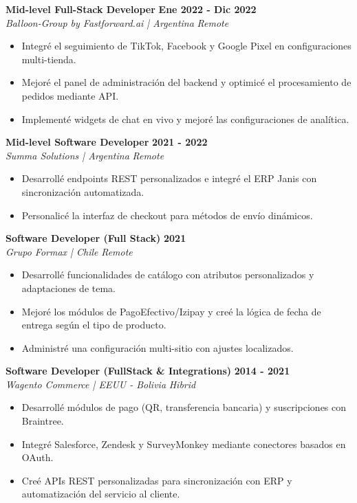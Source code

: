 \documentclass[11pt, a4paper]{article}
\newcommand{\jobtitle}[2]{\textbf{#1} \hfill \textbf{\small #2}} %
\newcommand{\company}[1]{\textit{#1}} %
\begin{document}
\jobtitle{Mid-level Full-Stack Developer}{Ene 2022 - Dic 2022} \\
\company{Balloon-Group by Fastforward.ai | Argentina} \hfill \textit{Remote}
\begin{itemize}[noitemsep, topsep=3pt]
	\item Integré el seguimiento de TikTok, Facebook y Google Pixel en configuraciones multi-tienda.
	\item Mejoré el panel de administración del backend y optimicé el procesamiento de pedidos mediante API.
	\item Implementé widgets de chat en vivo y mejoré las configuraciones de analítica.
\end{itemize}


\jobtitle{Mid-level Software Developer}{2021 - 2022} \\
\company{Summa Solutions | Argentina} \hfill \textit{Remote}
\begin{itemize}[noitemsep, topsep=3pt]
	\item Desarrollé endpoints REST personalizados e integré el ERP Janis con sincronización automatizada.
	\item Personalicé la interfaz de checkout para métodos de envío dinámicos.
\end{itemize}

\jobtitle{Software Developer (Full Stack)}{2021} \\
\company{Grupo Formax | Chile} \hfill \textit{Remote}
\begin{itemize}[noitemsep, topsep=3pt]
	\item Desarrollé funcionalidades de catálogo con atributos personalizados y adaptaciones de tema.
	\item Mejoré los módulos de PagoEfectivo/Izipay y creé la lógica de fecha de entrega según el tipo de producto.
	\item Administré una configuración multi-sitio con ajustes localizados.
\end{itemize}

\jobtitle{Software Developer (FullStack \& Integrations)}{2014 - 2021} \\
\company{Wagento Commerce | EEUU - Bolivia} \hfill \textit{Hibrid}
\begin{itemize}[noitemsep, topsep=3pt]
	\item Desarrollé módulos de pago (QR, transferencia bancaria) y suscripciones con Braintree.
	\item Integré Salesforce, Zendesk y SurveyMonkey mediante conectores basados en OAuth.
	\item Creé APIs REST personalizadas para sincronización con ERP y automatización del servicio al cliente.
\end{itemize}
\end{document}
